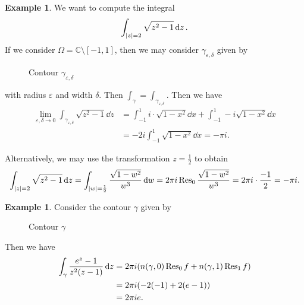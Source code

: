 \documentclass[leqno, openany]{memoir}
\theoremstyle{definition}
\newtheorem{exm}[thm]{Example}
\theoremstyle{remark}
\theoremstyle{plain}
\theoremstyle{definition}
\theoremstyle{remark}
\newcommand{\C}{\mathbb{C}}
\newcommand{\ep}{\varepsilon}
\begin{document}
\begin{exm} We want to compute the integral \[ \int_{\abs{z} = 2} \sqrt{z^2-1}
    \dd{z}. \] If we consider $\Omega = \C \setminus [-1,1]$, then we may
    consider $\gamma_{\ep, \delta}$ given by \begin{figure}[H] \begin{center}
         \end{center}
        \caption{Contour $\gamma_{\ep, \delta}$}%
    \end{figure}
        with radius $\ep$ and width $\delta$. Then $\int_{\gamma} =
        \int_{\gamma_{\ep, \delta}}$. Then we have \begin{align*} \lim_{\ep,
            \delta \to 0} \int_{\gamma_{\ep, \delta}} \sqrt{z^2-1} \dd{z} &=
            \int_{-1}^1 i \cdot \sqrt{1-x^2} \dd{x}+ \int_{-1}^1 -i
            \sqrt{1-x^2} \dd{x} \\ &= -2i \int_{-1}^1 \sqrt{1-x^2} \dd{x} =
            -\pi i.  \end{align*}

    Alternatively, we may use the transformation $z = \frac{1}{2}$ to obtain \[
    \int_{\abs{z} = 2} \sqrt{z^2-1} \dd{z} = \int_{\abs{w} = \frac{1}{2}}
\frac{\sqrt{1-w^2}}{w^3} \dd{w} = 2 \pi i \Res_0 \frac{\sqrt{1-w^2}}{w^3} = 2
\pi i \cdot \frac{-1}{2} = - \pi i. \] \end{exm}

\begin{exm} Consider the contour $\gamma$ given by \begin{figure}[H]
    \begin{center}  \end{center}
                \caption{Contour $\gamma$}%
            \end{figure} Then we
                have \begin{align*} \int_{\gamma} \frac{e^z-1}{z^2(z-1)} \dd{z}
                &= 2 \pi i (n(\gamma, 0) \Res_0 f + n(\gamma, 1) \Res_1 f) \\
                &= 2 \pi i (-2(-1) + 2(e-1)) \\ &= 2 \pi i e.  \end{align*}
            \end{exm}
\end{document}
